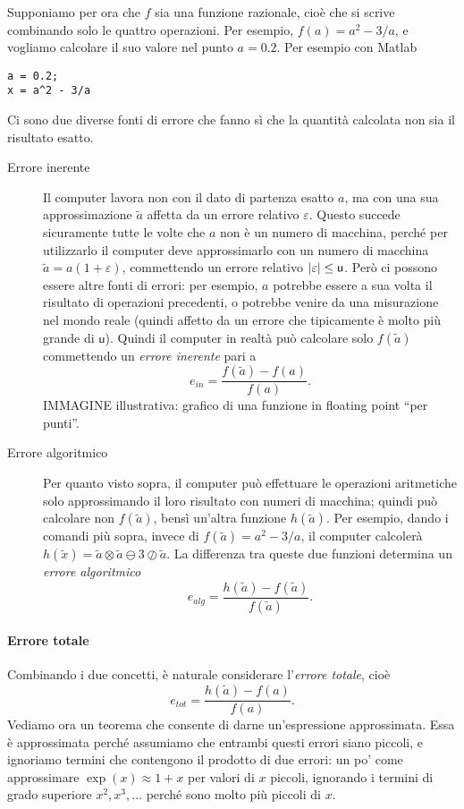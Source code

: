 \documentclass[a4paper]{report}
\DeclarePairedDelimiter{\abs}{\lvert}{\rvert}
\theoremstyle{definiton}
\theoremstyle{remark}
\begin{document}
Supponiamo per ora che $f$ sia una funzione razionale, cioè che si scrive combinando solo le quattro operazioni. Per esempio, $f(a) = a^2 - 3/a$, e vogliamo calcolare il suo valore nel punto $a = 0.2$. Per esempio con Matlab
\begin{lstlisting}
a = 0.2;
x = a^2 - 3/a
\end{lstlisting}
Ci sono due diverse fonti di errore che fanno sì che la quantità calcolata non sia il risultato esatto.
\begin{description}
    \item[Errore inerente] Il computer lavora non con il dato di partenza esatto $a$, ma con una sua approssimazione $\tilde{a}$ affetta da un errore relativo $\varepsilon$. Questo succede sicuramente tutte le volte che $a$ non è un numero di macchina, perché per utilizzarlo il computer deve approssimarlo con un numero di macchina $\tilde{a} = a(1+\varepsilon)$, commettendo un errore relativo $\abs{\varepsilon} \leq \mathsf{u}$. Però ci possono essere altre fonti di errori: per esempio, $a$ potrebbe essere a sua volta il risultato di operazioni precedenti, o potrebbe venire da una misurazione nel mondo reale (quindi affetto da un errore che tipicamente è molto più grande di $\mathsf{u}$). Quindi il computer in realtà può calcolare solo $f(\tilde{a})$ commettendo un \emph{errore inerente} pari a
    \begin{equation} \label{e_in}
        e_{in} = \frac{f(\tilde{a}) - f(a)}{f(a)}.    
    \end{equation}
    IMMAGINE illustrativa: grafico di una funzione in floating point ``per punti''.

    \item[Errore algoritmico] Per quanto visto sopra, il computer può effettuare le operazioni aritmetiche solo approssimando il loro risultato con numeri di macchina; quindi può calcolare non $f(\tilde{a})$, bensì un'altra funzione $h(\tilde{a})$. Per esempio, dando i comandi più sopra, invece di $f(\tilde{a}) = a^2 - 3/a$, il computer calcolerà $h(\tilde{x}) = \tilde{a} \otimes \tilde{a} \ominus 3 \oslash \tilde{a}$. La differenza tra queste due funzioni determina un \emph{errore algoritmico}
    \[
    e_{alg} = \frac{h(\tilde{a}) - f(\tilde{a})}{f(\tilde{a})}.
    \]
\end{description}

\paragraph{Errore totale} Combinando i due concetti, è naturale considerare l'\emph{errore totale}, cioè
\[
e_{tot} = \frac{h(\tilde{a}) - f(a)}{f(a)}.
\]
Vediamo ora un teorema che consente di darne un'espressione approssimata. Essa è approssimata perché assumiamo che entrambi questi errori siano piccoli, e ignoriamo termini che contengono il prodotto di due errori: un po' come approssimare $\exp(x) \approx 1 + x$ per valori di $x$ piccoli, ignorando i termini di grado superiore $x^2, x^3, \dots$ perché sono molto più piccoli di $x$. 
\end{document}
